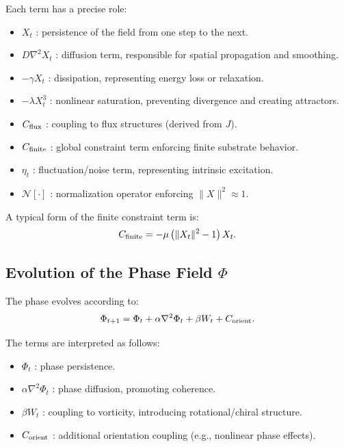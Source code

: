 \documentclass[11pt]{article}
\begin{document}
Each term has a precise role:

\begin{itemize}
\item $X_t$ : persistence of the field from one step to the next.
\item $D \nabla^2 X_t$ : diffusion term, responsible for spatial propagation and smoothing.
\item $-\gamma X_t$ : dissipation, representing energy loss or relaxation.
\item $-\lambda X_t^3$ : nonlinear saturation, preventing divergence and creating attractors.
\item $C_{\rm flux}$ : coupling to flux structures (derived from $J$).
\item $C_{\rm finite}$ : global constraint term enforcing finite substrate behavior.
\item $\eta_t$ : fluctuation/noise term, representing intrinsic excitation.
\item $\mathcal{N}[\cdot]$ : normalization operator enforcing $\|X\|^2 \approx 1$.
\end{itemize}

A typical form of the finite constraint term is:
\begin{equation}
C_{\rm finite} = -\mu \left(\|X_t\|^2 - 1\right) X_t.
\end{equation}

\subsection{Evolution of the Phase Field $\Phi$}

The phase evolves according to:
\begin{equation}
\Phi_{t+1}
=
\Phi_t
+ \alpha \nabla^2 \Phi_t
+ \beta W_t
+ C_{\rm orient}.
\end{equation}

The terms are interpreted as follows:

\begin{itemize}
\item $\Phi_t$ : phase persistence.
\item $\alpha \nabla^2 \Phi_t$ : phase diffusion, promoting coherence.
\item $\beta W_t$ : coupling to vorticity, introducing rotational/chiral structure.
\item $C_{\rm orient}$ : additional orientation coupling (e.g., nonlinear phase effects).
\end{itemize}
\end{document}
